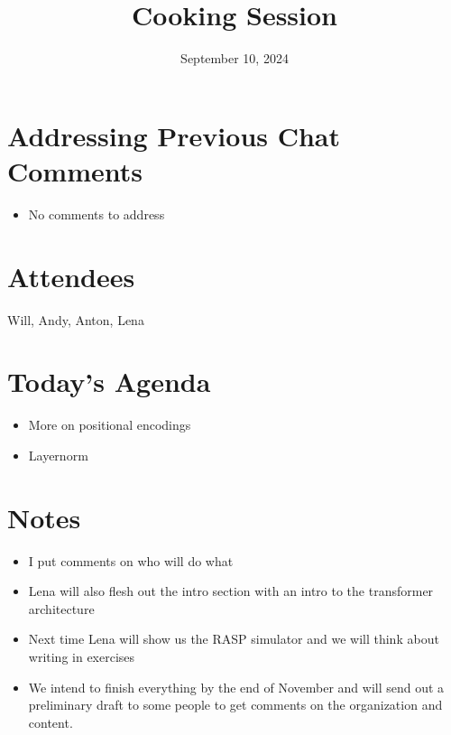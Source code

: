 \documentclass{article}
\title{Cooking Session}
\date{September 10, 2024}
\begin{document}
\maketitle

\section{Addressing Previous Chat Comments}
\begin{itemize}
   \item No comments to address
\end{itemize}

\section{Attendees}

Will, Andy, Anton, Lena

\section{Today's Agenda}
\begin{itemize}
    \item More on positional encodings
    \item Layernorm
\end{itemize}

\section{Notes}
\begin{itemize}
    \item I put comments on who will do what
    \item Lena will also flesh out the intro section with an intro to the transformer architecture
    \item Next time Lena will show us the RASP simulator and we will think about writing in exercises
    \item We intend to finish everything by the end of November and will send out a preliminary draft to some people to get comments on the organization and content.
\end{itemize}



\end{document}

